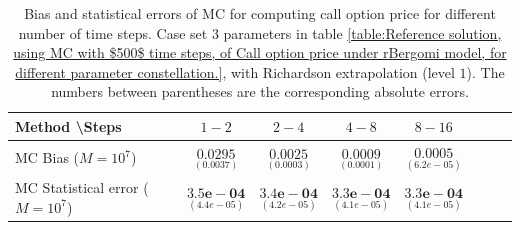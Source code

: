 \begin{table}[h!]
	\centering
	\begin{tabular}{l*{6}{c}r}
		Method \textbackslash  Steps            & $1-2$ & $2-4$ & $4-8$ & $8-16$  \\
		\hline
		MC Bias ($M=10^7$)  &$\underset{(  0.0037
			)}{\mathbf{0.0295}}$  & $\underset{( 0.0003)}{\mathbf{0.0025}}$  & $\underset{(   0.0001)}{\mathbf{0.0009}}$  & $\underset{(  6.2e-05)}{\mathbf{0.0005}}$ \\	
		
		MC Statistical error ($M=10^7$)   & $\underset{(  4.4e-05)}{\mathbf{3.5e-04}}$  & $\underset{(   4.2e-05)}{\mathbf{3.4e-04}}$  & $\underset{(  4.1e-05)}{\mathbf{3.3e-04}}$ & $\underset{(  4.1e-05)}{\mathbf{3.3e-04}}$ \\	
	
		\hline
	\end{tabular}
	\caption{Bias and statistical errors of MC   for computing call option price  for different number of time steps. Case set $3$ parameters in table \ref{table:Reference solution, using MC with $500$ time steps, of Call option price under rBergomi model, for different parameter constellation.}, with Richardson extrapolation (level $1$). The numbers between parentheses are the corresponding absolute errors.}
	\label{Bias and Statistical errors of MC ($M=10^7$)  for computing Call option price  for different number of time steps. Case set $3$ parameters, with Richardson extrapolation (level1). The numbers between parentheses are the corresponding absolute errors.}
\end{table}



\FloatBarrier




